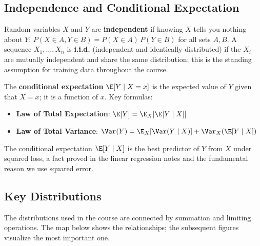\documentclass[main.tex]{subfiles}
\begin{document}
\subsection{Independence and Conditional Expectation}

Random variables $X$ and $Y$ are \textbf{independent} if knowing $X$ tells you nothing about $Y$: $P(X \in A, Y \in B) = P(X \in A)\,P(Y \in B)$ for all sets $A, B$. A sequence $X_1, \ldots, X_n$ is \textbf{i.i.d.} (independent and identically distributed) if the $X_i$ are mutually independent and share the same distribution; this is the standing assumption for training data throughout the course.

The \textbf{conditional expectation} $\E[Y \mid X = x]$ is the expected value of $Y$ given that $X = x$; it is a function of $x$. Key formulas:
\begin{itemize}
    \item \textbf{Law of Total Expectation}: $\E[Y] = \E_X[\E[Y \mid X]]$
    \item \textbf{Law of Total Variance}: $\Var(Y) = \E_X[\Var(Y \mid X)] + \Var_X(\E[Y \mid X])$
\end{itemize}

The conditional expectation $\E[Y \mid X]$ is the best predictor of $Y$ from $X$ under squared loss, a fact proved in the linear regression notes and the fundamental reason we use squared error.

\subsection{Key Distributions}

The distributions used in the course are connected by summation and limiting operations. The map below shows the relationships; the subsequent figures visualize the most important one.
\end{document}

